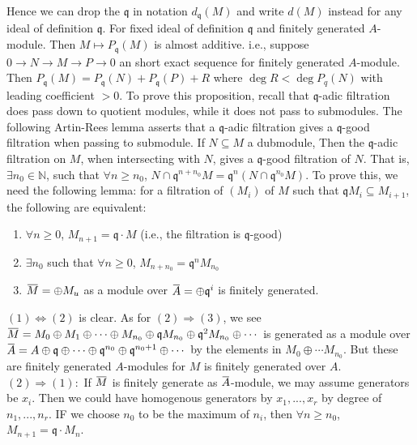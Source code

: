\documentclass[12pt]{article}
\theoremstyle{definition}
\theoremstyle{plain}
\newcommand{\nat}{\mathbb{N}}
\newcommand{\overbar}[1]{\mkern 1.5mu\overline{\mkern-1.5mu#1\mkern-1.5mu}\mkern 1.5mu}
\renewcommand{\bar}{\overbar}
\begin{document}
\medskip
Hence we can drop the $\mathfrak{q}$ in notation $d_\mathfrak{q}(M)$ and write $d(M)$ instead for any ideal of definition $\mathfrak{q}$.
\Prop For fixed ideal of definition $\mathfrak{q}$ and finitely generated $A$-module. Then $M\mapsto P_\mathfrak{q}(M)$ is almost additive. i.e., suppose $0\to N\to M\to P\to 0$ an short exact sequence for finitely generated $A$-module. Then $P_\mathfrak{q}(M)=P_\mathfrak{q}(N)+P_\mathfrak{q}(P)+R$ where $\deg R<\deg P_q(N)$ with leading coefficient $>0$.
\Rmk To prove this proposition, recall that $\mathfrak{q}$-adic filtration does pass down to quotient modules, while it does not pass to submodules. The following Artin-Rees lemma asserts that a $\mathfrak{q}$-adic filtration gives a $\mathfrak{q}$-good filtration when passing to submodule.
 If $N\subseteq M$ a dubmodule, Then the $\mathfrak{q}$-adic filtration on $M$, when intersecting with $N$, gives a $\mathfrak{q}$-good filtration of $N$. That is, $\exists n_0\in \nat$, such that $\forall n\geq n_0$, $N\cap \mathfrak{q}^{n+n_0}M=\mathfrak{q}^n(N\cap \mathfrak{q}^{n_0}M)$.
To prove this, we need the following lemma:
\Lemma for a filtration of $(M_i)$ of $M$ such that $\mathfrak{q}M_i\subseteq M_{i+1}$, the following are equivalent:
\begin{enumerate}
  \item $\forall n\geq 0$, $M_{n+1}=\mathfrak{q}\cdot M$ (i.e., the filtration is $\mathfrak{q}$-good)
  \item $\exists n_0$ such that $\forall n\geq 0$, $M_{n+n_0}=\mathfrak{q}^nM_{n_0}$
  \item $\bar{M}=\oplus M_u$ as a module over $\bar{A}=\oplus \mathfrak{q}^i$ is finitely generated.
\end{enumerate}
\proof $(1)\iff (2)$ is clear. As for $(2)\Rightarrow (3)$, we see $\bar{M}=M_0\oplus M_1\oplus \cdots \oplus M_{n_0}\oplus \mathfrak{q}M_{n_0}\oplus\mathfrak{q}^2M_{n_0}\oplus \cdots$ is generated as a module over $\bar{A}=A\oplus \mathfrak{q}\oplus \cdots \oplus \mathfrak{q}^{n_0}\oplus \mathfrak{q}^{n_0+1}\oplus \cdots$ by the elements in $M_0\oplus \cdots M_{n_0}$. But these are finitely generated $A$-modules for $M$ is finitely generated over $A$. \\
\indent $(2)\Rightarrow (1):$ If $\bar{M}$ is finitely generate as $\bar{A}$-module, we may assume generators be $x_i$. Then we could have homogenous generators by $x_1, ..., x_r$ by degree of $n_1, ..., n_r$. IF we choose $n_0$ to be the maximum of $n_i$, then $\forall n\geq n_0$, $M_{n+1}=\mathfrak{q}\cdot M_n$.
\end{document}
